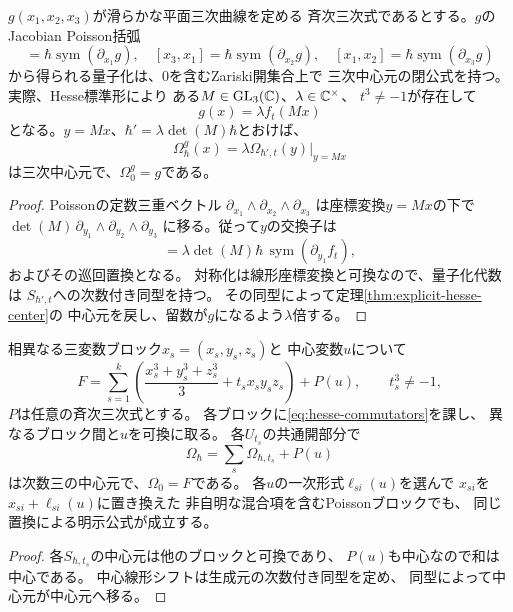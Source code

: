 \begin{corollary}[任意の滑らかな三変数三次式]
\label{cor:arbitrary-smooth-ternary-cubic}
$g(x_1,x_2,x_3)$が滑らかな平面三次曲線を定める
斉次三次式であるとする。$g$のJacobian Poisson括弧
\begin{equation}
 [x_2,x_3]=\hbar\operatorname{sym}(\partial_{x_1}g),
 \quad [x_3,x_1]=\hbar\operatorname{sym}(\partial_{x_2}g),
 \quad [x_1,x_2]=\hbar\operatorname{sym}(\partial_{x_3}g)
\end{equation}
から得られる量子化は、$0$を含むZariski開集合上で
三次中心元の閉公式を持つ。
実際、Hesse標準形\cite[Lemma 1]{ArtebaniDolgachev}により
ある$M\in\mathrm{GL}_3(\mathbb C)$、$\lambda\in\mathbb C^\times$、
$t^3\ne-1$が存在して
\begin{equation}
 g(x)=\lambda f_t(Mx)
\end{equation}
となる。$y=Mx$、$\hbar'=\lambda\det(M)\hbar$とおけば、
\begin{equation}
 \boxed{\ \Omega^g_\hbar(x)=
  \lambda\Omega_{\hbar',t}(y)\big|_{y=Mx}\ }
 \label{eq:arbitrary-ternary-central}
\end{equation}
は三次中心元で、$\Omega^g_0=g$である。
\end{corollary}
\begin{proof}
Poissonの定数三重ベクトル
$\partial_{x_1}\wedge\partial_{x_2}\wedge\partial_{x_3}$
は座標変換$y=Mx$の下で
$\det(M)\,
 \partial_{y_1}\wedge\partial_{y_2}\wedge\partial_{y_3}$
に移る。従って$y$の交換子は
\begin{equation}
 [y_2,y_3]
 =\lambda\det(M)\hbar\,
   \operatorname{sym}(\partial_{y_1}f_t),
\end{equation}
およびその巡回置換となる。
対称化は線形座標変換と可換なので、量子化代数は
$S_{\hbar',t}$への次数付き同型を持つ。
その同型によって定理\ref{thm:explicit-hesse-center}の
中心元を戻し、留数が$g$になるよう$\lambda$倍する。
\end{proof}

\begin{corollary}[中心変数と独立ブロックの閉公式]
\label{cor:hesse-block-center}
相異なる三変数ブロック$x_s=(x_s,y_s,z_s)$と
中心変数$u$について
\begin{equation}
 F=\sum_{s=1}^k
 \left(\frac{x_s^3+y_s^3+z_s^3}{3}
       +t_sx_sy_sz_s\right)+P(u),
 \qquad t_s^3\ne-1,
\end{equation}
$P$は任意の斉次三次式とする。
各ブロックに\eqref{eq:hesse-commutators}を課し、
異なるブロック間と$u$を可換に取る。
各$U_{t_s}$の共通開部分で
\begin{equation}
 \Omega_\hbar
   =\sum_s\Omega_{\hbar,t_s}+P(u)
 \label{eq:hesse-multiblock}
\end{equation}
は次数三の中心元で、$\Omega_0=F$である。
各$u$の一次形式$\ell_{si}(u)$を選んで
$x_{si}$を$x_{si}+\ell_{si}(u)$に置き換えた
非自明な混合項を含むPoissonブロックでも、
同じ置換による明示公式が成立する。
\end{corollary}
\begin{proof}
各$S_{\hbar,t_s}$の中心元は他のブロックと可換であり、
$P(u)$も中心なので和は中心である。
中心線形シフトは生成元の次数付き同型を定め、
同型によって中心元が中心元へ移る。
\end{proof}



